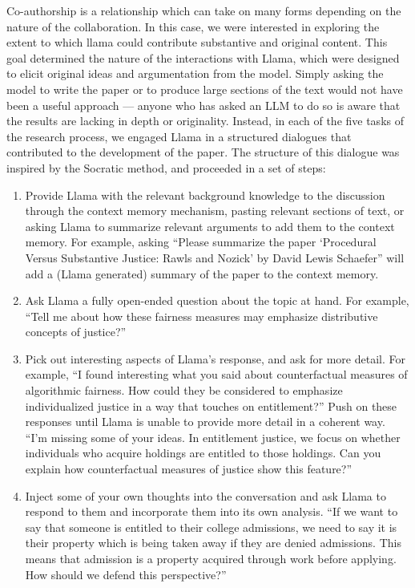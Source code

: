 Co-authorship is a relationship which can take on many forms depending on the
nature of the collaboration. In this case, we were interested in exploring the
extent to which llama could contribute substantive and original content. This
goal determined the nature of the interactions with Llama, which were designed
to elicit original ideas and argumentation from the model. Simply asking the
model to write the paper or to produce large sections of the text would not have
been a useful approach — anyone who has asked an LLM to do so is aware that the
results are lacking in depth or originality. Instead, in each of the five tasks
of the research process, we engaged Llama in a structured dialogues that
contributed to the development of the paper. The structure of this dialogue was
inspired by the Socratic method, and proceeded in a set of steps:
\begin{enumerate}
    \item Provide Llama with the relevant background knowledge to the discussion
          through the context memory mechanism, pasting relevant sections of
          text, or asking Llama to summarize relevant arguments to add them to
          the context memory. For example, asking ``Please summarize the paper
          `Procedural Versus Substantive Justice: Rawls and Nozick' by David Lewis
          Schaefer'' will add a (Llama generated) summary of the paper to the context memory.
    \item Ask Llama a fully open-ended question about the topic at hand. For
          example, ``Tell me about how these fairness measures may emphasize
          distributive concepts of justice?''
    \item Pick out interesting aspects of Llama's response, and ask for more
          detail. For example, ``I found interesting what you said about
          counterfactual measures of algorithmic fairness. How could they be
          considered to emphasize individualized justice in a way that touches
          on entitlement?'' Push on these responses until Llama is unable to
          provide more detail in a coherent way. ``I'm missing some of your
          ideas. In entitlement justice, we focus on whether individuals who
          acquire holdings are entitled to those holdings. Can you explain how
          counterfactual measures of justice show this feature?''
    \item Inject some of your own thoughts into the conversation and ask Llama 
          to respond to them and incorporate them into its own analysis. ``If we
          want to say that someone is entitled to their college admissions, we
          need to say it is their property which is being taken away if they are
          denied admissions. This means that admission is a property acquired
          through work before applying. How should we defend this perspective?''
\end{enumerate}

